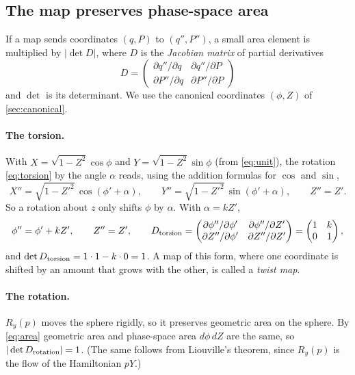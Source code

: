 \documentclass[11pt,a4paper]{article}
\begin{document}
\subsection{The map preserves phase-space area}\label{sec:area}

If a map sends coordinates $(q,P)$ to $(q'', P'')$, a small area element is multiplied by $|\det D|$, where $D$ is
the \emph{Jacobian matrix} of partial derivatives
\begin{equation*}
  D = \begin{pmatrix} \partial q''/\partial q & \partial q''/\partial P\\ \partial P''/\partial q & \partial P''/\partial P\end{pmatrix}
\end{equation*}
and $\det$ is its determinant. We use the canonical coordinates $(\phi, Z)$ of \cref{sec:canonical}.

\paragraph{The torsion.} With $X = \sqrt{1-Z^2}\cos\phi$ and $Y = \sqrt{1-Z^2}\sin\phi$ (from \eqref{eq:unit}), the
rotation \eqref{eq:torsion} by the angle $\alpha$ reads, using the addition formulas for $\cos$ and $\sin$,
\begin{equation*}
  X'' = \sqrt{1-Z'^2}\,\cos(\phi'+\alpha), \qquad Y'' = \sqrt{1-Z'^2}\,\sin(\phi'+\alpha), \qquad Z'' = Z' .
\end{equation*}
So a rotation about $z$ only shifts $\phi$ by $\alpha$. With $\alpha = kZ'$,
\begin{equation}\label{eq:twist}
  \phi'' = \phi' + kZ', \qquad Z'' = Z' ,
  \qquad
  D_{\rm torsion} = \begin{pmatrix} \partial\phi''/\partial\phi' & \partial\phi''/\partial Z'\\ \partial Z''/\partial\phi' & \partial Z''/\partial Z'\end{pmatrix}
  = \begin{pmatrix}1 & k\\ 0 & 1\end{pmatrix},
\end{equation}
and $\det D_{\rm torsion} = 1\cdot1 - k\cdot0 = 1$. A map of this form, where one coordinate is shifted by an amount
that grows with the other, is called a \emph{twist map}.

\paragraph{The rotation.} $R_y(p)$ moves the sphere rigidly, so it preserves geometric area on the sphere. By
\eqref{eq:area} geometric area and phase-space area $d\phi\,dZ$ are the same, so $|\det D_{\rm rotation}| = 1$. (The
same follows from Liouville's theorem, since $R_y(p)$ is the flow of the Hamiltonian $pY$.)
\end{document}
